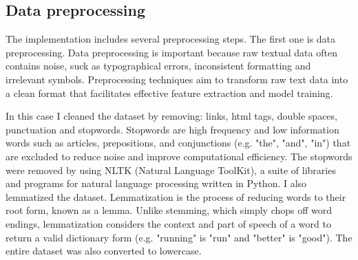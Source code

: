 \documentclass{article}
\begin{document}
\subsection{Data preprocessing}

The implementation includes several preprocessing steps.
The first one is data preprocessing.
Data preprocessing is important because raw textual data often contains noise, suck as typographical errors, inconsistent formatting and irrelevant symbols.
Preprocessing techniques aim to transform raw text data into a clean format that facilitates effective feature extraction and model training.

In this case I cleaned the dataset by removing: links, html tags, double spaces, punctuation and stopwords.
Stopwords are high frequency and low information words such as articles, prepositions, and conjunctions (e.g. "the", "and", "in") that are excluded to reduce noise and improve computational efficiency.
The stopwords were removed by using NLTK (Natural Language ToolKit), a suite of libraries and programs for natural language processing written in Python.
I also lemmatized the dataset.
Lemmatization is the process of reducing words to their root form, known as a lemma.
Unlike stemming, which simply chops off word endings, lemmatization considers the context and part of speech of a word to return a valid dictionary form (e.g. "running" is "run" and "better" is "good").
The entire dataset was also converted to lowercase.
\end{document}
